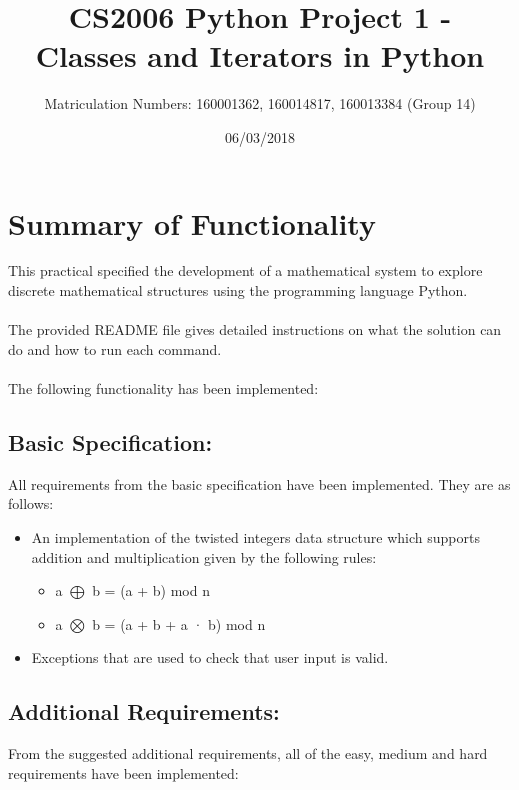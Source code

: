 \documentclass[11]{article}
\title{CS2006 Python Project 1 - \\Classes and Iterators in Python}
\date{06/03/2018}
\author{Matriculation Numbers: 160001362, 160014817, 160013384 (Group 14)}
\begin{document}
	\maketitle
	\newpage
	\tableofcontents
	
	\newpage
	\section{Summary of Functionality}
		This practical specified the development of a mathematical system to explore discrete mathematical structures using the programming language Python. \\\\
The provided README file gives detailed instructions on what the solution can do and how to run each command. \\\\
The following functionality has been implemented:
	\subsection{Basic Specification:}
		All requirements from the basic specification have been implemented. They are as follows:	
		\begin{itemize}
			\item An implementation of the twisted integers data structure which supports addition and multiplication given by the following rules:
				\begin{itemize}
				\item a $\bigoplus$ b = (a + b) mod n 
				\item a $\bigotimes$ b = (a + b + a · b) mod n
				\end{itemize}
			\item Exceptions that are used to check that user input is valid.
		\end{itemize}
	
	\subsection{Additional Requirements:}
	 From the suggested additional requirements, all of the easy, medium and hard requirements have been implemented:
\end{document}
